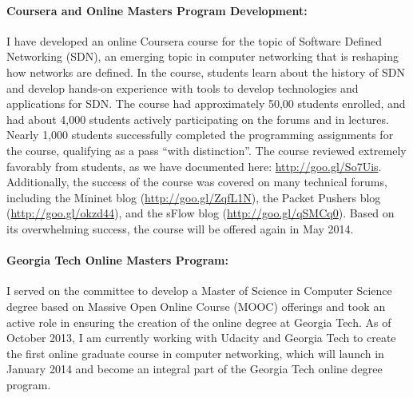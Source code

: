 \paragraph{Coursera and Online Masters Program Development:} I have
developed an online Coursera course for the topic of Software Defined
Networking (SDN), an emerging topic in computer networking that is
reshaping how networks are defined.  In the course, students learn about
the history of SDN and develop hands-on experience with tools to develop
technologies and applications for SDN.  The course had approximately
50,00 students enrolled, and had about 4,000 students actively
participating on the forums and in lectures.  Nearly 1,000 students
successfully completed the programming assignments for the course,
qualifying as a pass ``with distinction''.  The course reviewed
extremely favorably from students, as we have documented here:
\url{http://goo.gl/So7Uis}.  Additionally, the success of the course was
covered on many technical forums, including the Mininet blog
(\url{http://goo.gl/ZqfL1N}), the Packet Pushers blog
(\url{http://goo.gl/okzd44}), and the sFlow blog
(\url{http://goo.gl/qSMCq0}).  Based on its overwhelming success, the
course will be offered again in May 2014.


\paragraph{Georgia Tech Online Masters Program:} 
I served on the committee to develop a Master of Science in
Computer Science degree based on Massive Open Online Course (MOOC)
offerings and took an active role in ensuring the creation of the online
degree at Georgia Tech.  As of October 2013, I am currently working with
Udacity and Georgia Tech to create the first online graduate course in
computer networking, which will launch in January 2014 and become an
integral part of the Georgia Tech online degree program.

